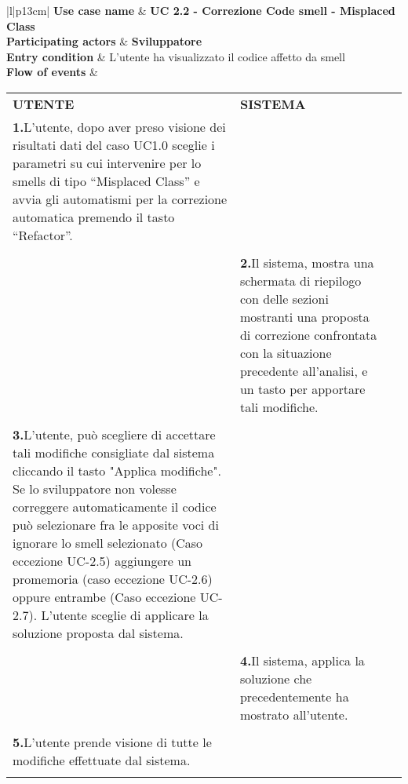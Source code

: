 		\begin{tabular}{|l|p{13cm}|}
			\hline
			\textbf{Use case name}  & \textbf{UC 2.2 - Correzione Code smell - Misplaced Class} \\ \hline
			\textbf{Participating actors}  & \textbf{Sviluppatore} \\ \hline
			\textbf{Entry condition}  & L’utente ha visualizzato il codice affetto da smell  \\  \hline
			\textbf{Flow of events}  &  
			\begin{tabular}{p{6cm}p{6cm}p{6cm}}
				\centering \textbf{UTENTE} & \centering \textbf{SISTEMA} & \\
				\textbf{1.}\hspace{0.3cm}L’utente, dopo aver preso visione dei risultati dati del caso UC1.0 sceglie i parametri su cui intervenire per lo smells di tipo “Misplaced Class” e avvia gli automatismi per la correzione automatica premendo il tasto “Refactor”.
				\\ \\ &
				\textbf{2.}\hspace{0.3cm}Il sistema, mostra una schermata di riepilogo con delle sezioni mostranti una proposta di correzione   confrontata con la situazione precedente all’analisi, e un tasto per apportare tali modifiche. \\ \\
				
				\textbf{3.}\hspace{0.3cm}L’utente, può scegliere di accettare tali modifiche consigliate dal sistema cliccando il tasto "Applica modifiche". Se lo sviluppatore non volesse correggere automaticamente il codice può   selezionare fra le   apposite voci di ignorare lo smell selezionato (Caso eccezione UC-2.5)   aggiungere un promemoria (caso eccezione UC-2.6) oppure entrambe (Caso eccezione   UC-2.7). L'utente sceglie di applicare la soluzione proposta dal sistema.
				\\ \\ &
				\textbf{4.}\hspace{0.3cm}Il sistema, applica la soluzione che precedentemente ha mostrato all'utente. \\ \\
				
				\textbf{5.}\hspace{0.3cm}L'utente prende visione di tutte le modifiche effettuate dal sistema. \\ \\
				

\end{tabular}
\end{tabular}
